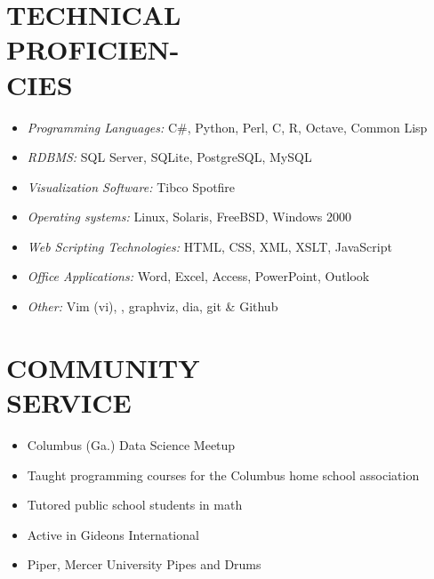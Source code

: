 \documentclass[margin, 10pt]{res} %
\begin{document}
\begin{resume}

\section{TECHNICAL\\ PROFICIEN-\\ CIES}

\begin{itemize} \itemsep -2pt %

\item {\it Programming Languages:} C\#, Python, Perl, C, \textsf{R},  Octave, Common Lisp
\item {\it RDBMS:} SQL Server, SQLite, PostgreSQL, MySQL 
\item {\it Visualization Software:} Tibco Spotfire
\item {\it Operating systems:} Linux, Solaris, FreeBSD, Windows 2000
\item {\it Web Scripting Technologies:} HTML, CSS, XML, XSLT, JavaScript
\item {\it Office Applications:} Word, Excel, Access, PowerPoint, Outlook
\item {\it Other:} Vim (vi), \LaTeXe, graphviz, dia, git \& Github
\end{itemize}

 


\section{COMMUNITY \\ SERVICE}

\begin{itemize} \itemsep -2pt %
    \item Columbus (Ga.) Data Science Meetup
    \item Taught programming courses for the Columbus home school association
    \item Tutored public school students in math
    \item Active in Gideons International
    \item Piper, Mercer University Pipes and Drums
\end{itemize}


\end{resume}
\end{document}
